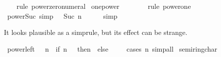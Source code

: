 \begin{isabellebody}
%
\isadelimproof
\ \ %
\endisadelimproof
%
\isatagproof
{}\isamarkupfalse%
\ {\isacharparenleft}{\kern0pt}rule\ power{\isacharunderscore}{\kern0pt}zero{\isacharunderscore}{\kern0pt}numeral{\isacharparenright}{\kern0pt}%
\endisatagproof
{\isafoldproof}%
%
\isadelimproof
%
\endisadelimproof
\isanewline
\isanewline
{}\isamarkupfalse%
\ one{\isacharunderscore}{\kern0pt}power{}{\isacharcolon}{\kern0pt}\ {\isachardoublequoteopen}{}\ {\isacharequal}{\kern0pt}\ {}{\isachardoublequoteclose}\ \isanewline
%
\isadelimproof
\ \ %
\endisadelimproof
%
\isatagproof
{}\isamarkupfalse%
\ {\isacharparenleft}{\kern0pt}rule\ power{\isacharunderscore}{\kern0pt}one{\isacharparenright}{\kern0pt}%
\endisatagproof
{\isafoldproof}%
%
\isadelimproof
%
\endisadelimproof
\isanewline
\isanewline
{}\isamarkupfalse%
\ power{\isacharunderscore}{\kern0pt}{}{\isacharunderscore}{\kern0pt}Suc\ {\isacharbrackleft}{\kern0pt}simp{\isacharbrackright}{\kern0pt}{\isacharcolon}{\kern0pt}\ {\isachardoublequoteopen}{}\ {\isacharcircum}{\kern0pt}\ Suc\ n\ {\isacharequal}{\kern0pt}\ {}{\isachardoublequoteclose}\isanewline
%
\isadelimproof
\ \ %
\endisadelimproof
%
\isatagproof
{}\isamarkupfalse%
\ simp%
\endisatagproof
{\isafoldproof}%
%
\isadelimproof
%
\endisadelimproof
%
\begin{isamarkuptext}%
It looks plausible as a simprule, but its effect can be strange.%
\end{isamarkuptext}\isamarkuptrue%
\isamarkupfalse%
\ power{\isacharunderscore}{\kern0pt}{}{\isacharunderscore}{\kern0pt}left{\isacharcolon}{\kern0pt}\ {\isachardoublequoteopen}{}\ {\isacharcircum}{\kern0pt}\ n\ {\isacharequal}{\kern0pt}\ {\isacharparenleft}{\kern0pt}if\ n\ {\isacharequal}{\kern0pt}\ {}\ then\ {}\ else\ {}{\isacharparenright}{\kern0pt}{\isachardoublequoteclose}\isanewline
%
\isadelimproof
\ \ %
\endisadelimproof
%
\isatagproof
{}\isamarkupfalse%
\ {\isacharparenleft}{\kern0pt}cases\ n{\isacharparenright}{\kern0pt}\ simp{\isacharunderscore}{\kern0pt}all%
\endisatagproof
{\isafoldproof}%
%
\isadelimproof
\isanewline
%
\endisadelimproof
\isanewline
{}\isamarkupfalse%
\isanewline
\isanewline
{}\isamarkupfalse%
\ semiring{\isacharunderscore}{\kern0pt}char{\isacharunderscore}{\kern0pt}{}\ \isanewline
\isanewline
{}\isamarkupfalse%

\end{isabellebody}
